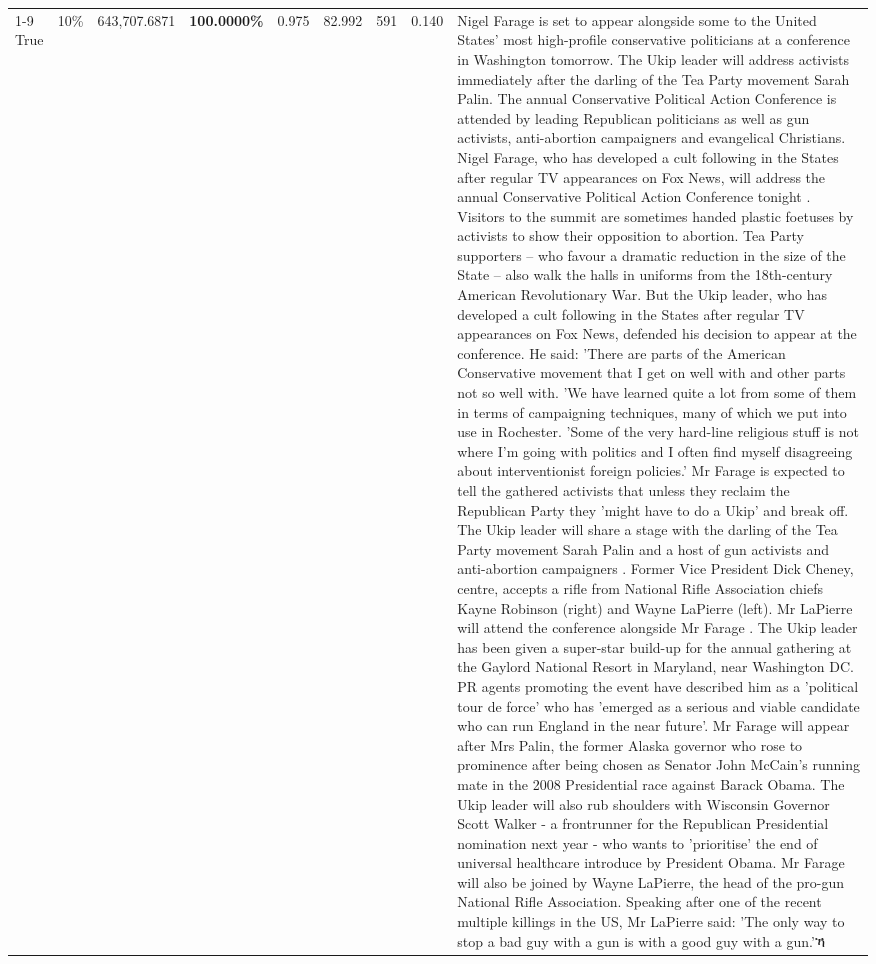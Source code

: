 \begin{table}[H]
\begin{tabular}{lllrlllll}
\cline{1-9} \cline{2-9}
True & 10\% & 643,707.6871 & \bfseries \color{red} 100.0000\% & 0.975 & 82.992 & 591 & 0.140 & Nigel Farage is set to appear alongside some to the United States' most high-profile conservative politicians at a conference in Washington tomorrow. The Ukip leader will address activists immediately after the darling of the Tea Party movement Sarah Palin. The annual Conservative Political Action Conference is attended by leading Republican politicians as well as gun activists, anti-abortion campaigners and evangelical Christians. Nigel Farage, who has developed a cult following in the States after regular TV appearances on Fox News, will address the annual Conservative Political Action Conference tonight . Visitors to the summit are sometimes handed plastic foetuses by activists to show their opposition to abortion. Tea Party supporters – who favour a dramatic reduction in the size of the State – also walk the halls in uniforms from the 18th-century American Revolutionary War. But the Ukip leader, who has developed a cult following in the States after regular TV appearances on Fox News, defended his decision to appear at the conference. He said: 'There are parts of the American Conservative movement that I get on well with and other parts not so well with. 'We have learned quite a lot from some of them in terms of campaigning techniques, many of which we put into use in Rochester. 'Some of the very hard-line religious stuff is not where I'm going with politics and I often find myself disagreeing about interventionist foreign policies.' Mr Farage is expected to tell the gathered activists that unless they reclaim the Republican Party they 'might have to do a Ukip' and break off. The Ukip leader will share a stage with the darling of the Tea Party movement Sarah Palin and a host of gun activists and anti-abortion campaigners . Former Vice President Dick Cheney, centre, accepts a rifle from National Rifle Association chiefs Kayne Robinson (right) and Wayne LaPierre (left). Mr LaPierre will attend the conference alongside Mr Farage . The Ukip leader has been given a super-star build-up for the annual gathering at the Gaylord National Resort in Maryland, near Washington DC. PR agents promoting the event have described him as a 'political tour de force' who has 'emerged as a serious and viable candidate who can run England in the near future'. Mr Farage will appear after Mrs Palin, the former Alaska governor who rose to prominence after being chosen as Senator John McCain's running mate in the 2008 Presidential race against Barack Obama. The Ukip leader will also rub shoulders with Wisconsin Governor Scott Walker - a frontrunner for the Republican Presidential nomination next year - who wants to 'prioritise' the end of universal healthcare introduce by President Obama. Mr Farage will also be joined by Wayne LaPierre, the head of the pro-gun National Rifle Association. Speaking after one of the recent multiple killings in the US, Mr LaPierre said: 'The only way to stop a bad guy with a gun is with a good guy with a gun.'ኻ \\

\end{tabular}
\end{table}
